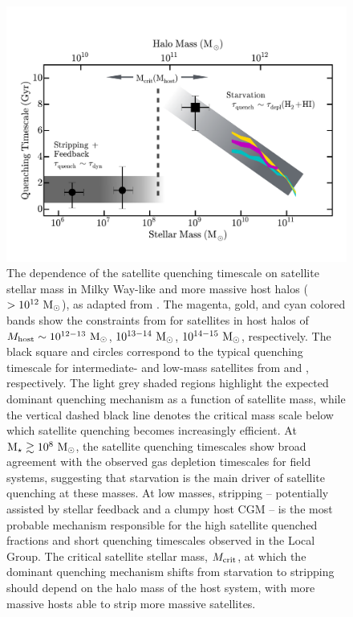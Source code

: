 

\begin{figure}
 \centering
 \hspace*{-0.2in}
   \includegraphics[width=6in]{underpressure/f8.pdf}
   \caption[Updated physical model from TCBFlash]{The dependence of the satellite quenching timescale on
     satellite stellar mass in Milky Way-like and more massive host
     halos ($>10^{12}~{\rm M}_{\odot}$), as adapted from \citet{fham15}. The
     magenta, gold, and cyan colored bands show the constraints from
     \citet{wetzel13} for satellites in host halos of $M_{\rm host}
     \sim 10^{12-13}~{\rm M}_{\odot}$, $10^{13-14}~{\rm M}_{\odot}$, $10^{14-15}~{\rm M}_{\odot}$,
     respectively. The black square and circles correspond to the
     typical quenching timescale for intermediate- and low-mass
     satellites from \citet{wheeler14} and \citet{fham15},
     respectively. The light grey shaded regions highlight the
     expected dominant quenching mechanism as a function of satellite
     mass, while the vertical dashed black line denotes the critical
     mass scale below which satellite quenching becomes increasingly
     efficient. At ${\rm M}_{\star} \gtrsim10^{8}~{\rm M}_{\odot}$, the satellite
     quenching timescales show broad agreement with the observed gas
     depletion timescales for field systems, suggesting that
     starvation is the main driver of satellite quenching at these
     masses. 
     At low masses, stripping -- potentially assisted by
     stellar feedback and a clumpy host CGM -- is the most probable
     mechanism responsible for the high satellite quenched fractions
     and short quenching timescales observed in the Local Group.
     The critical satellite stellar mass, $M_{\rm crit}$, at which the
     dominant quenching mechanism shifts from starvation to stripping
     should depend on the halo mass of the host system, with more
     massive hosts able to strip more massive satellites. }
 \label{fig:model}
\end{figure}

